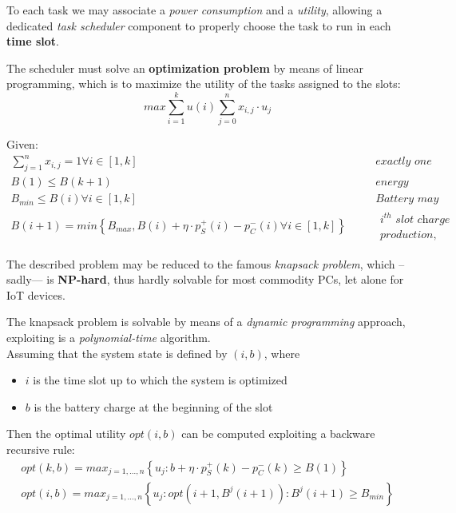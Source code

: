    To each task we may associate a \textit{power consumption} and a \textit{utility}, allowing a dedicated \textit{task scheduler} component to properly choose the task to run in each \textbf{time slot}.
   


The scheduler must solve an \textbf{optimization problem} by means of linear programming, which is to maximize the utility of the tasks assigned to the slots:
\begin{equation}
   max \sum_{i=1}^{k}u(i) \sum_{j=0}^{n}x_{i,j}\cdot u_{j}
\end{equation}

Given:
\begin{align}
   \sum_{j=1}^{n}x_{i,j}=1 \forall i \in [1,k] & \quad & \textit{exactly one task per slot}\\
   B(1) \leq B(k+1) & \quad & \textit{energy neutrality}\\
   B_{min} \leq B(i) \forall i \in [1,k] & \quad & \textit{Battery may never go below the minimum}\\
   B(i+1) = min\left\{B_{max}, B(i) + \eta\cdot p_S^+(i) - p_C^-(i) \forall i \in [1,k]\right\} & \quad & \begin{aligned}\textit{$i^{th}$ slot charge depends on initial charge,} \\ \textit{production, and consumption in the slot}\end{aligned}
\end{align}

The described problem may be reduced to the famous \textit{knapsack problem}, which --sadly--- is \textbf{NP-hard}, thus hardly solvable for most commodity PCs, let alone for IoT devices.

The knapsack problem is solvable by means of a \textit{dynamic programming} approach, exploiting is a \textit{polynomial-time} algorithm.\\
Assuming that the system state is defined by $(i,b)$, where
\begin{itemize}
   \item $i$ is the time slot up to which the system is optimized
   \item $b$ is the battery charge at the beginning of the slot
\end{itemize}
Then the optimal utility $opt(i,b)$ can be computed exploiting a backware recursive rule:
\begin{align}
   opt(k,b) = max_{j=1,\dots,n} \left\{u_j : b + \eta\cdot p_S^+(k) - p_C^-(k) \geq B(1)\right\}\\
   opt(i,b) = max_{j=1,\dots,n} \left\{u_j : opt\left(i+1, B^j(i+1)\right):B^j(i+1) \geq B_{min}\right\}
\end{align}
